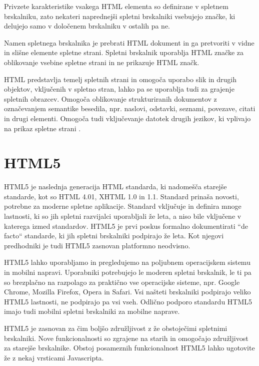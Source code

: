\documentclass[a4paper, 12pt]{book}
\begin{document}
Privzete karakteristike vsakega HTML elementa so definirane v spletnem brskalniku, zato nekateri naprednej\v si spletni brskalniki vsebujejo zna\v cke, ki delujejo samo v dolo\v cenem brskalniku v ostalih pa ne.

Namen spletnega brskalnika je prebrati HTML dokument in ga pretvoriti v vidne in sli\v sne elemente spletne strani. Spletni brskalnik uporablja HTML zna\v cke za oblikovanje vsebine spletne strani in ne prikazuje HTML zna\v ck.

HTML predstavlja temelj spletnih strani in omogo\v ca uporabo slik in drugih objektov, vklju\v cenih v spletno stran, lahko pa se uporablja tudi za grajenje spletnih obrazcev. Omogo\v ca oblikovanje strukturiranih dokumentov z ozna\v cevanjem semantike besedila, npr. naslovi, odstavki, seznami, povezave, citati in drugi elementi. Omogo\v ca tudi vklju\v cevanje datotek drugih jezikov, ki vplivajo na prikaz spletne strani
\cite{wikipedia-html}.

\section{HTML5}
HTML5 je naslednja generacija HTML standarda, ki nadome\v s\v ca starej\v se standarde, kot so HTML 4.01, XHTML 1.0 in 1.1. Standard prina\v sa novosti, potrebne za moderne spletne aplikacije. Standard vklju\v cuje in definira mnoge lastnosti, ki so jih spletni razvijalci uporabljali \v ze leta, a niso bile vklju\v cene v katerega izmed standardov. HTML5 je prvi poskus formalno dokumentirati ``de facto`` standarde, ki jih spletni brskalniki podpirajo \v ze leta. Kot njegovi predhodniki je tudi HTML5 zasnovan platformno neodvisno.

HTML5 lahko uporabljamo in pregledujemo na poljubnem operacijskem sistemu in mobilni napravi. Uporabniki potrebujejo le moderen spletni brskalnik, le ti pa so brezpla\v cno na razpolago za prakti\v cno vse operacijske sisteme, npr. Google Chrome, Mozilla Firefox, Opera in Safari. Vsi na\v steti brskalniki podpirajo veliko HTML5 lastnosti, ne podpirajo pa vsi vseh. Odli\v cno podporo standardu HTML5 imajo tudi mobilni spletni brskalniki za mobilne naprave.

HTML5 je zasnovan za \v cim bolj\v so zdru\v zljivost z \v ze obstoje\v cimi spletnimi
brskalniki. Nove funkcionalnosti so zgrajene na starih in omogo\v cajo zdru\v zljivost
za starej\v se brskalnike. Obstoj posameznih funkcionalnost
HTML5 lahko ugotovite \v ze z nekaj vrsticami Javascripta.
\cite{html5}
\end{document}
